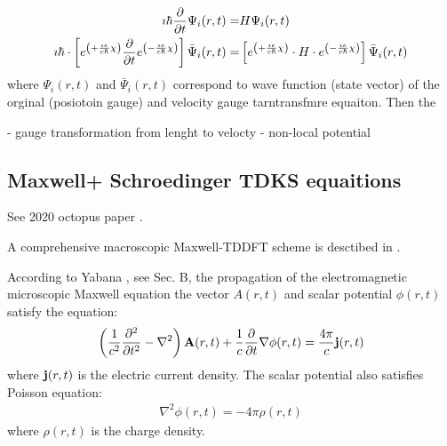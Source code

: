 \documentclass[11pt]{article}
\begin{document}
 \begin{align*}
    \imath \hbar \pdv{}{t}\Psi_i (r,t)  =&  H \Psi_i (r,t) \\
    \imath \hbar \cdot  \left[ e^{\left( + \frac{\imath e}{c \hbar} \chi \right) }  \pdv{}{t}   
   e^{\left( - \frac{\imath e}{c \hbar} \chi \right) }  \right] \bar \Psi_i (r,t)  =& 
   \left[e^{\left(+\frac{\imath e}{c \hbar} \chi \right)} \cdot H \cdot e^{\left( -\frac{\imath e}{c \hbar} \chi \right)}  \right]    
\bar \Psi_i (r,t) \\
\end{align*}    
where  $\Psi_i (r,t)$  and $\bar \Psi_i (r,t)$ correspond to wave function (state vector)   of the orginal (posiotoin gauge) and  velocity gauge tarntransfmre equaiton.
Then  the

-  gauge transformation from  lenght to  velocty 
-  non-local potential

\subsection{Maxwell+ Schroedinger  TDKS equaitions}

See 2020 octopus paper \cite{octopus-rt-tddft-JCP-2020}.

A comprehensive macroscopic Maxwell-TDDFT scheme is desctibed in  \cite{prb-2018-Yabana}.


According to  Yabana \cite{prb-2018-Yabana}, see Sec. B, the propagation of the electromagnetic  microscopic Maxwell  equation  the vector $A(r,t)$ and scalar  potential $\phi(r,t)$ satisfy the equation:
\begin{align*}
    \left( \frac{1}{c^2} \pdv{^2}{t^2} -\nabla^2 \right) \vb{A}(r,t)  + \frac{1}{c} \pdv{}{t} \nabla \phi(r,t) = \frac{4\pi}{c} \vb j(r,t)
\end{align*}
where $\vb j(r,t)$ is the electric current density. The scalar potential also satisfies Poisson equation:
\begin{align*}
    \nabla^2 \phi(r,t) = - 4\pi \rho(r,t)
\end{align*}
 where $\rho(r,t)$ is  the charge density.
\end{document}
